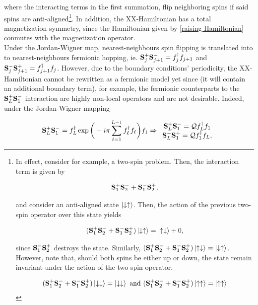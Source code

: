 \documentclass{homework}
\begin{document}
where the interacting terms in the first summation, flip neighboring spins if said spins are anti-aligned\footnote{In effect, consider for example, a two-spin problem. Then, the interaction term is given by 

$$
{\bf S}_1^+ {\bf S}_2^- + {\bf S}_1^- {\bf S}_2^+,
$$

and consider an anti-aligned state $\ket{\downarrow\uparrow}$. Then, the action of the previous two-spin operator over this state yields

$$
({\bf S}_1^+ {\bf S}_2^- + {\bf S}_1^- {\bf S}_2^+) \ket{\downarrow\uparrow} = \ket{\uparrow\downarrow} + 0,
$$

since ${\bf S}_1^- {\bf S}_2^+$ destroys the state. Similarly, $({\bf S}_1^+ {\bf S}_2^- + {\bf S}_1^- {\bf S}_2^+)\ket{\uparrow\downarrow} = \ket{\downarrow\uparrow}$. However, note that, should both spins be either up or down, the state remain invariant under the action of the two-spin operator. 

\begin{align}
    ({\bf S}_1^+ {\bf S}_2^- + {\bf S}_1^- {\bf S}_2^+) \ket{\downarrow\downarrow} = \ket{\downarrow\downarrow} \textnormal{ and } ({\bf S}_1^+ {\bf S}_2^- + {\bf S}_1^- {\bf S}_2^+) \ket{\uparrow\uparrow} = \ket{\uparrow\uparrow} 
\end{align}}. In addition, the XX-Hamiltonian has a total magnetization symmetry, since the Hamiltonian given by \eqref{raising Hamiltonian} conmutes with the magnetization operator. \\

Under the Jordan-Wigner map, nearest-neighbours spin flipping is translated into to nearest-neighbours fermionic hopping, ie. ${\bf S}_{j}^{+} {\bf S}_{j+1}^{-} = f_{j}^{\dagger} f_{j+1}$ and ${\bf S}_{j}^{-} {\bf S}_{j+1}^{+} = f_{j+1}^{\dagger} f_{j}$. However, due to the boundary conditions' periodicity, the XX-Hamiltonian cannot be rewritten as a fermionic model yet since (it will contain an additional boundary term), for example, the fermionic counterparts to the ${\bf S}_{L}^{+} {\bf S}_{1}^{-}$ interaction are highly non-local operators and are not desirable. Indeed, under the Jordan-Wigner mapping 

\begin{equation*}
    {\bf S}_{L}^{+} {\bf S}_{1}^{-} = f_L^\dagger \exp\bigg(-i\pi \sum_{\ell = 1}^{L-1} f_\ell^\dagger f_\ell \bigg) f_1 \Rightarrow \begin{array}{cc}
       {\bf S}_{L}^{+} {\bf S}_{1}^{-} = \mathcal{Q} f_L^\dagger f_1 \\
       {\bf S}_{L}^{-} {\bf S}_{1}^{+} = \mathcal{Q} f_1^\dagger f_L,
    \end{array}
\end{equation*}
\end{document}
